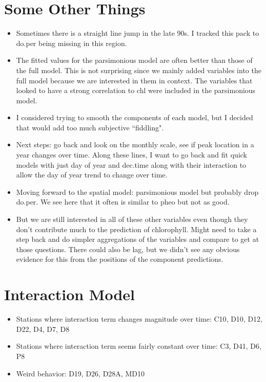 \documentclass[12pt]{amsart}
\begin{document}
\section{Some Other Things}

\begin{itemize}
\item Sometimes there is a straight line jump in the late 90s. I tracked this pack to do.per being missing in this region.
\item The fitted values for the parsimonious model are often better than those of the full model. This is not surprising since we mainly added variables into the full model because we are interested in them in context. The variables that looked to have a strong correlation to chl were included in the parsimonious model.
\item I considered trying to smooth the components of each model, but I decided that would add too much subjective ``fiddling".
\item Next steps: go back and look on the monthly scale, see if peak location in a year changes over time. Along these lines, I want to go back and fit quick models with just day of year and dec.time along with their interaction to allow the day of year trend to change over time. 
\item Moving forward to the spatial model: parsimonious model but probably drop do.per. We see here that it often is similar to pheo but not as good.
\item But we are still interested in all of these other variables even though they don't contribute much to the prediction of chlorophyll. Might need to take a step back and do simpler aggregations of the variables and compare to get at those questions. There could also be lag, but we didn't see any obvious evidence for this from the positions of the component predictions.
\end{itemize}

\section{Interaction Model}

\begin{itemize}
\item Stations where interaction term changes magnitude over time: C10, D10, D12, D22, D4, D7, D8
\item Stations where interaction term seems fairly constant over time: C3, D41, D6, P8
\item Weird behavior: D19, D26, D28A, MD10
\end{itemize}
\end{document}

